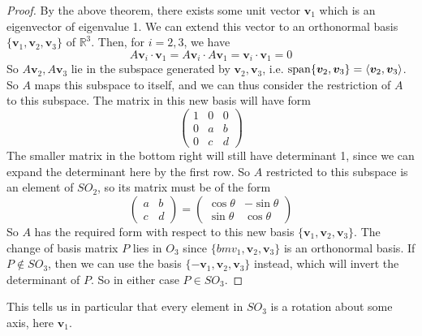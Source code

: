 \documentclass{article}
\begin{document}
\begin{proof}
	By the above theorem, there exists some unit vector $\bm v_1$ which is an eigenvector of eigenvalue 1. We can extend this vector to an orthonormal basis $\{ \bm v_1, \bm v_2, \bm v_3 \}$ of $\mathbb R^3$. Then, for $i=2,3$, we have
	\[ A\bm v_i \cdot \bm v_1 = A\bm v_i \cdot A\bm v_1 = \bm v_i \cdot \bm v_1 = 0 \]
	So $A\bm v_2, A\bm v_3$ lie in the subspace generated by $\bm v_2, \bm v_3$, i.e. $\operatorname{span} \{ \bm v_2, \bm v_3 \} = \langle \bm v_2, \bm v_3 \rangle$. So $A$ maps this subspace to itself, and we can thus consider the restriction of $A$ to this subspace. The matrix in this new basis will have form
	\[ \begin{pmatrix}
			1 & 0 & 0 \\
			0 & a & b \\
			0 & c & d
		\end{pmatrix} \]
	The smaller matrix in the bottom right will still have determinant 1, since we can expand the determinant here by the first row. So $A$ restricted to this subspace is an element of $SO_2$, so its matrix must be of the form
	\[ \begin{pmatrix}
			a & b \\ c & d
		\end{pmatrix} = \begin{pmatrix}
			\cos \theta & -\sin \theta \\
			\sin \theta & \cos \theta
		\end{pmatrix} \]
	So $A$ has the required form with respect to this new basis $\{ \bm v_1, \bm v_2, \bm v_3 \}$. The change of basis matrix $P$ lies in $O_3$ since $\{ bm v_1, \bm v_2, \bm v_3 \}$ is an orthonormal basis. If $P \notin SO_3$, then we can use the basis $\{ -\bm v_1, \bm v_2, \bm v_3 \}$ instead, which will invert the determinant of $P$. So in either case $P \in SO_3$.
\end{proof}
This tells us in particular that every element in $SO_3$ is a rotation about some axis, here $\bm v_1$.
\end{document}
